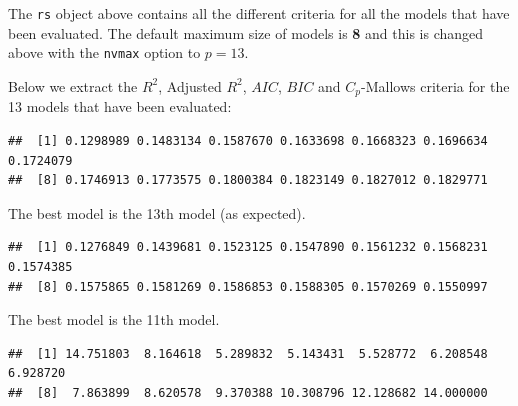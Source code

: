 \documentclass[
]{book}
\newenvironment{Shaded}{\begin{snugshade}}{\end{snugshade}}
\newcommand{\DocumentationTok}[1]{\textcolor[rgb]{0.56,0.35,0.01}{\textbf{\textit{#1}}}}
\newcommand{\NormalTok}[1]{#1}
\newcommand{\SpecialCharTok}[1]{\textcolor[rgb]{0.81,0.36,0.00}{\textbf{#1}}}
\begin{document}
The \texttt{rs} object above contains all the different criteria for all the models that have been evaluated. The default maximum size of models is \textbf{8} and this is changed above with the \texttt{nvmax} option to \(p=13\).

Below we extract the \(R^2\), Adjusted \(R^2\), \(AIC\), \(BIC\) and \(C_p\)-Mallows criteria for the 13 models that have been evaluated:

\begin{Shaded}
\end{Shaded}

\begin{verbatim}
##  [1] 0.1298989 0.1483134 0.1587670 0.1633698 0.1668323 0.1696634 0.1724079
##  [8] 0.1746913 0.1773575 0.1800384 0.1823149 0.1827012 0.1829771
\end{verbatim}

The best model is the 13th model (as expected).

\begin{Shaded}
\end{Shaded}

\begin{verbatim}
##  [1] 0.1276849 0.1439681 0.1523125 0.1547890 0.1561232 0.1568231 0.1574385
##  [8] 0.1575865 0.1581269 0.1586853 0.1588305 0.1570269 0.1550997
\end{verbatim}

The best model is the 11th model.

\begin{Shaded}
\end{Shaded}

\begin{verbatim}
##  [1] 14.751803  8.164618  5.289832  5.143431  5.528772  6.208548  6.928720
##  [8]  7.863899  8.620578  9.370388 10.308796 12.128682 14.000000
\end{verbatim}
\end{document}
